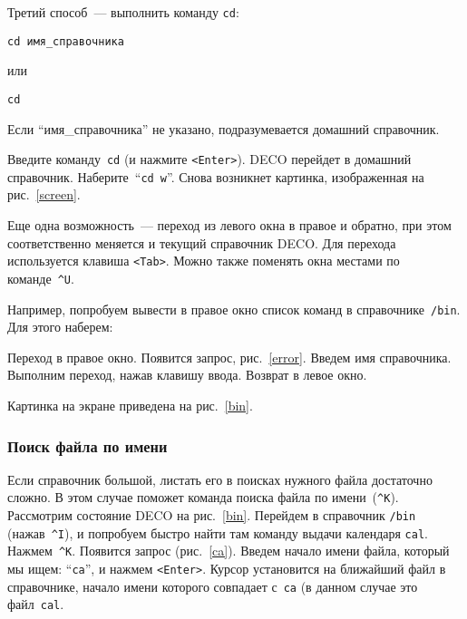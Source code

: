 
Третий способ~--- выполнить команду {\tt cd}:
\begin{source}
\begin{verbatim}
cd имя_справочника
\end{verbatim}
\end{source}
или
\begin{source}
\begin{verbatim}
cd
\end{verbatim}
\end{source}
Если ``имя\_справочника'' не указано, подразумевается домашний справочник.

Введите команду~{\tt cd} (и нажмите {\tt <Enter>}). DECO перейдет
в домашний справочник. Наберите~``{\tt cd w}''. Снова возникнет картинка,
изображенная на рис.~\ref{screen}.

Еще одна возможность~--- переход из левого окна в правое и обратно, при
этом соответственно меняется и текущий справочник DECO. Для перехода
используется клавиша {\tt <Tab>}. Можно также поменять
окна местами по команде~{\tt \^{}U}.

Например, попробуем вывести в правое окно список команд
в справочнике~{\tt /bin}. Для этого наберем:

\begin{example}
Переход в правое окно.
Появится запрос, рис.~\ref{error}.
Введем имя справочника.
Выполним переход, нажав клавишу ввода.
Возврат в левое окно.
\end{example}

Картинка на экране приведена на рис.~\ref{bin}.


\subsubsection{Поиск файла по имени}

Если справочник большой, листать его в поисках нужного файла
достаточно сложно. В этом случае поможет команда поиска файла по
имени~({\tt \^{}K}).
Рассмотрим состояние DECO на рис.~\ref{bin}.
Перейдем в справочник {\tt /bin} (нажав~{\tt \^{}I}), и
попробуем быстро найти там команду выдачи календаря {\tt cal}.
Нажмем~{\tt \^{}K}. Появится запрос (рис.~\ref{ca}).
Введем начало имени файла, который мы ищем: ``{\tt ca}'',
и нажмем {\tt <Enter>}. Курсор установится на ближайший файл в
справочнике, начало имени которого совпадает с~{\tt ca} (в данном случае
это файл~{\tt cal}.

